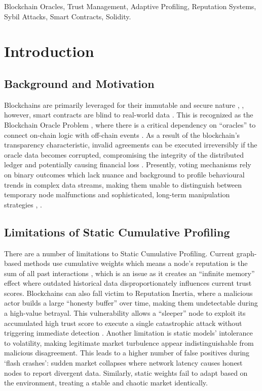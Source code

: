 \documentclass{ieeeaccess}
\begin{document}
\begin{keywords}
Blockchain Oracles, Trust Management, Adaptive Profiling, Reputation Systems, Sybil Attacks, Smart Contracts, Solidity.
\end{keywords}

\titlepgskip=-15pt

\maketitle

\section{Introduction}
\label{sec:introduction}

\subsection{Background and Motivation}
Blockchains are primarily leveraged for their immutable and secure nature \cite{b1}, \cite{b2}, however, smart contracts are blind to real-world data \cite{b3}. This is recognized as the Blockchain Oracle Problem \cite{b4}, where there is a critical dependency on ``oracles'' to connect on-chain logic with off-chain events \cite{b5}. As a result of the blockchain's transparency characteristic, invalid agreements can be executed irreversibly if the oracle data becomes corrupted, compromising the integrity of the distributed ledger and potentially causing financial loss \cite{b6}. Presently, voting mechanisms rely on binary outcomes which lack nuance and background to profile behavioural trends in complex data streams, making them unable to distinguish between temporary node malfunctions and sophisticated, long-term manipulation strategies \cite{b6}, \cite{b7}.

\subsection{Limitations of Static Cumulative Profiling}
There are a number of limitations to Static Cumulative Profiling. Current graph-based methods use cumulative weights which means a node's reputation is the sum of all past interactions \cite{b7}, which is an issue as it creates an ``infinite memory'' effect where outdated historical data disproportionately influences current trust scores. Blockchains can also fall victim to Reputation Inertia, where a malicious actor builds a large ``honesty buffer'' over time, making them undetectable during a high-value betrayal. This vulnerability allows a ``sleeper'' node to exploit its accumulated high trust score to execute a single catastrophic attack without triggering immediate detection \cite{b13}. Another limitation is static models' intolerance to volatility, making legitimate market turbulence appear indistinguishable from malicious disagreement. This leads to a higher number of false positives during `flash crashes': sudden market collapses where network latency causes honest nodes to report divergent data. Similarly, static weights fail to adapt based on the environment, treating a stable and chaotic market identically.
\end{document}
